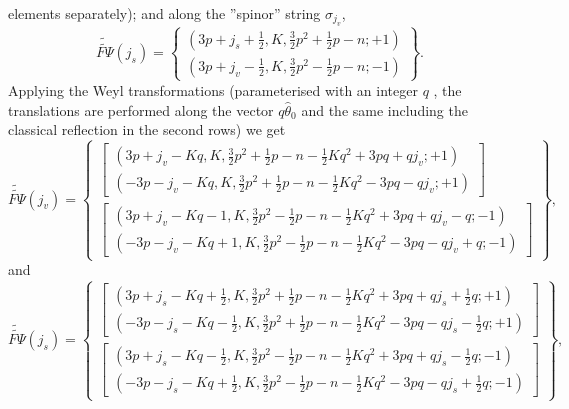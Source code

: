 \documentclass{article}
\begin{document}
elements separately); and along the ''spinor'' string $\sigma _{j_{v}}$,
\begin{equation*}
\widetilde{\widetilde{F\Psi }}\left( j_{s}\right) =\left\{
\begin{array}{c}
\left( 3p+j_{s}+\frac{1}{2},K,\frac{3}{2}p^{2}+\frac{1}{2}p-n;+1\right)  \\
\left( 3p+j_{v}-\frac{1}{2},K,\frac{3}{2}p^{2}-\frac{1}{2}p-n;-1\right)
\end{array}
\right\} .
\end{equation*}
Applying the Weyl transformations (parameterised with an integer $q$ , the
translations are performed along the vector $q\widehat{\theta }_{0}$ and the
same including the classical reflection in the second rows) we get
\begin{equation*}
\widetilde{\widetilde{F\Psi }}\left( j_{v}\right) =\left\{
\begin{array}{c}
\left[
\begin{array}{c}
\left( 3p+j_{v}-Kq,K,\frac{3}{2}p^{2}+\frac{1}{2}p-n-\frac{1}{2}%
Kq^{2}+3pq+qj_{v};+1\right)  \\
\left( -3p-j_{v}-Kq,K,\frac{3}{2}p^{2}+\frac{1}{2}p-n-\frac{1}{2}%
Kq^{2}-3pq-qj_{v};+1\right)
\end{array}
\right]  \\
\left[
\begin{array}{c}
\left( 3p+j_{v}-Kq-1,K,\frac{3}{2}p^{2}-\frac{1}{2}p-n-\frac{1}{2}%
Kq^{2}+3pq+qj_{v}-q;-1\right)  \\
\left( -3p-j_{v}-Kq+1,K,\frac{3}{2}p^{2}-\frac{1}{2}p-n-\frac{1}{2}%
Kq^{2}-3pq-qj_{v}+q;-1\right)
\end{array}
\right]
\end{array}
\right\} ,
\end{equation*}
and
\begin{equation*}
\widetilde{\widetilde{F\Psi }}\left( j_{s}\right) =\left\{
\begin{array}{c}
\left[
\begin{array}{c}
\left( 3p+j_{s}-Kq+\frac{1}{2},K,\frac{3}{2}p^{2}+\frac{1}{2}p-n-\frac{1}{2}%
Kq^{2}+3pq+qj_{s}+\frac{1}{2}q;+1\right)  \\
\left( -3p-j_{s}-Kq-\frac{1}{2},K,\frac{3}{2}p^{2}+\frac{1}{2}p-n-\frac{1}{2}%
Kq^{2}-3pq-qj_{s}-\frac{1}{2}q;+1\right)
\end{array}
\right]  \\
\left[
\begin{array}{c}
\left( 3p+j_{s}-Kq-\frac{1}{2},K,\frac{3}{2}p^{2}-\frac{1}{2}p-n-\frac{1}{2}%
Kq^{2}+3pq+qj_{s}-\frac{1}{2}q;-1\right)  \\
\left( -3p-j_{s}-Kq+\frac{1}{2},K,\frac{3}{2}p^{2}-\frac{1}{2}p-n-\frac{1}{2}%
Kq^{2}-3pq-qj_{s}+\frac{1}{2}q;-1\right)
\end{array}
\right]
\end{array}
\right\} ,
\end{equation*}
\end{document}
